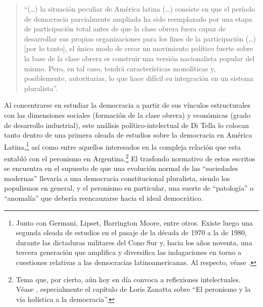 \begin{quote}
\enquote{(\dots) la situación peculiar de América latina (\dots) consiste en que el período de democracia parcialmente ampliada ha sido reemplazado por una etapa de participación total antes de que la clase obrera fuera capaz de desarrollar sus propias organizaciones para los fines de la participación (\dots) [por lo tanto], el único modo de crear un movimiento político fuerte sobre la base de la clase obrera es construir una versión nacionalista popular del mismo. Pero, en tal caso, tendrá características monolíticas y, posiblemente, autoritarias, lo que hace difícil su integración en un sistema pluralista}.
\end{quote}

Al concentrarse en estudiar la democracia a partir de sus vínculos estructurales con las dimensiones sociales (formación de la clase obrera) y económicas (grado de desarrollo industrial), este análisis político-intelectual de Di Tella lo colocan tanto dentro de una primera oleada de estudios sobre la democracia en América Latina,\footnote{Junto con Germani, Lipset, Barrington Moore, entre otros. Existe luego una segunda oleada de estudios en el pasaje de la década de 1970 a la de 1980, durante las dictaduras militares del Cono Sur y, hacia los años noventa, una tercera generación que amplifica y diversifica las indagaciones en torno a cuestiones relativas a las democracias latinoamericanas. Al respecto, véase \textcite{1554-CAMOU2007}.} así como entre aquellos interesados en la compleja relación que esta entabló con el peronismo en Argentina.\footnote{Tema que, por cierto, aún hoy en día convoca a reflexiones intelectuales. Véase \textcite{1543-NOVARO2014}, especialmente el capítulo de Loris Zanatta sobre \enquote{El peronismo y la vía holística a la democracia}.} El trasfondo normativo de estos escritos se encuentra en el supuesto de que una evolución normal de las \enquote{sociedades modernas} llevaría a una democracia constitucional pluralista, siendo los populismos en general, y el peronismo en particular, una suerte de \enquote{patología} o \enquote{anomalía} que debería reencauzarse hacia el ideal democrático.


